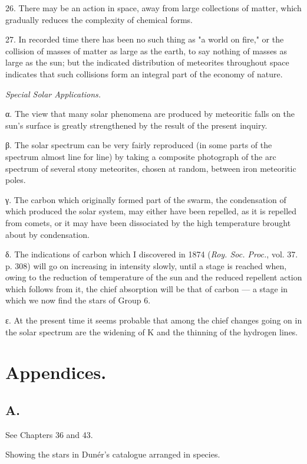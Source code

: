 \documentclass[a4paper, 12pt, oneside, polutonikogreek, english]{article}
\begin{document}
26. There may be an action in space, away from large collections of matter, which gradually reduces the complexity of chemical forms.

27. In recorded time there has been no such thing as "a world on fire," or the collision of masses of matter as large as the earth, to say nothing of masses as large as the sun; but the indicated distribution of meteorites throughout space indicates that such collisions form an integral part of the economy of nature.

\emph{Special Solar Applications.}

α. The view that many solar phenomena are produced by meteoritic falls on the sun's surface is greatly strengthened by the result of the present inquiry.

β. The solar spectrum can be very fairly reproduced (in some parts of the spectrum almost line for line) by taking a composite photograph of the arc spectrum of several stony meteorites, chosen at random, between iron meteoritic poles.

γ. The carbon which originally formed part of the swarm, the condensation of which produced the solar system, may either have been repelled, as it is repelled from comets, or it may have been dissociated by the high temperature brought about by condensation.

δ. The indications of carbon which I discovered in 1874 (\emph{Roy. Soc. Proc.}, vol. 37. p. 308) will go on increasing in intensity slowly, until a stage is reached when, owing to the reduction of temperature of the sun and the reduced repellent action which follows from it, the chief absorption will be that of carbon --- a stage in which we now find the stars of Group 6.

ε. At the present time it seems probable that among the chief changes going on in the solar spectrum are the widening of K and the thinning of the hydrogen lines.

\section{Appendices.}

\subsection{A.}

See Chapters 36 and 43.

Showing the stars in Dunér's catalogue arranged in species.
\end{document}
